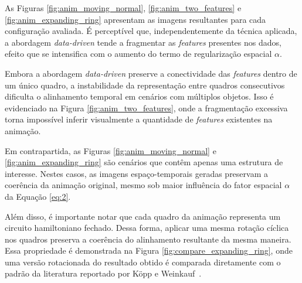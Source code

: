 \documentclass[12pt]{article}
\begin{document}
As Figuras \ref{fig:anim_moving_normal}, \ref{fig:anim_two_features} e \ref{fig:anim_expanding_ring} apresentam as imagens
resultantes para cada configuração avaliada. É perceptível que, independentemente da técnica aplicada, a abordagem
\textit{data-driven} tende a fragmentar as \textit{features} presentes nos dados, efeito que se intensifica com o
aumento do termo de regularização espacial $\alpha$.

Embora a abordagem \textit{data-driven} preserve a conectividade das \textit{features} dentro de um único quadro, a
instabilidade da representação entre quadros consecutivos dificulta o alinhamento temporal em cenários com múltiplos
objetos. Isso é evidenciado
na Figura \ref{fig:anim_two_features}, onde a fragmentação excessiva torna impossível inferir visualmente a quantidade
de \textit{features} existentes na animação.


Em contrapartida, as Figuras \ref{fig:anim_moving_normal} e \ref{fig:anim_expanding_ring} são cenários que contêm apenas uma
estrutura de interesse. Nestes casos, as imagens espaço-temporais geradas preservam a coerência da animação original, mesmo
sob maior influência do fator espacial $\alpha$ da Equação \ref{eq:2}.

Além disso, é importante notar que cada quadro da animação representa um circuito hamiltoniano fechado. Dessa forma,
aplicar uma mesma rotação cíclica nos quadros preserva a coerência do alinhamento resultante da mesma maneira. Essa
propriedade é demonstrada na Figura \ref{fig:compare_expanding_ring}, onde uma versão rotacionada do resultado
obtido é comparada diretamente com o padrão da literatura reportado por Köpp e Weinkauf~\cite{KoeppWeinkauf2022_TMTM}.
\end{document}
